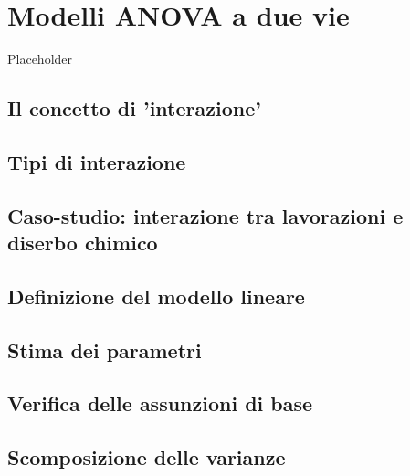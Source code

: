 \documentclass[a4paper,12pt,oneside]{book}
\begin{document}
\hypertarget{modelli-anova-a-due-vie}{%
\chapter{Modelli ANOVA a due vie}\label{modelli-anova-a-due-vie}}

Placeholder

\hypertarget{il-concetto-di-interazione}{%
\section{Il concetto di 'interazione'}\label{il-concetto-di-interazione}}

\hypertarget{tipi-di-interazione}{%
\section{Tipi di interazione}\label{tipi-di-interazione}}

\hypertarget{caso-studio-interazione-tra-lavorazioni-e-diserbo-chimico}{%
\section{Caso-studio: interazione tra lavorazioni e diserbo chimico}\label{caso-studio-interazione-tra-lavorazioni-e-diserbo-chimico}}

\hypertarget{definizione-del-modello-lineare-1}{%
\section{Definizione del modello lineare}\label{definizione-del-modello-lineare-1}}

\hypertarget{stima-dei-parametri-3}{%
\section{Stima dei parametri}\label{stima-dei-parametri-3}}

\hypertarget{verifica-delle-assunzioni-di-base}{%
\section{Verifica delle assunzioni di base}\label{verifica-delle-assunzioni-di-base}}

\hypertarget{scomposizione-delle-varianze}{%
\section{Scomposizione delle varianze}\label{scomposizione-delle-varianze}}
\end{document}
